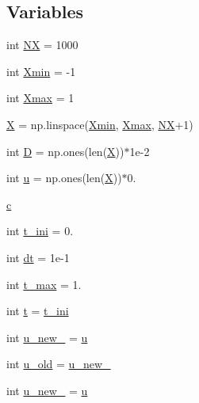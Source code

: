 \subsection*{Variables}
\begin{DoxyCompactItemize}
\item 
int \hyperlink{namespaceSplit__solvers_a6f5cab1ea541e5ae5d4ae5a0d62ab100}{NX} = 1000
\item 
int \hyperlink{namespaceSplit__solvers_abe1cb9889c38d9038ab77c312a857ae5}{Xmin} = -\/1
\item 
int \hyperlink{namespaceSplit__solvers_a3a9b8c9973a6efe018e8b1dd5c13a896}{Xmax} = 1
\item 
\hyperlink{namespaceSplit__solvers_a1884fc9efd3f156e55b75a45f19d7244}{X} = np.\+linspace(\hyperlink{namespaceSplit__solvers_abe1cb9889c38d9038ab77c312a857ae5}{Xmin}, \hyperlink{namespaceSplit__solvers_a3a9b8c9973a6efe018e8b1dd5c13a896}{Xmax}, \hyperlink{namespaceSplit__solvers_a6f5cab1ea541e5ae5d4ae5a0d62ab100}{NX}+1)
\item 
int \hyperlink{namespaceSplit__solvers_a0bcad395b64a658c374ba8a3fb893836}{D} = np.\+ones(len(\hyperlink{namespaceSplit__solvers_a1884fc9efd3f156e55b75a45f19d7244}{X}))$\ast$1e-\/2
\item 
int \hyperlink{namespaceSplit__solvers_abe87b0440e65cc15867b535fe5594457}{u} = np.\+ones(len(\hyperlink{namespaceSplit__solvers_a1884fc9efd3f156e55b75a45f19d7244}{X}))$\ast$0.
\item 
\hyperlink{namespaceSplit__solvers_a8d99b01f11e92c25fdef25ee372ef15e}{c}
\item 
int \hyperlink{namespaceSplit__solvers_a4e16fb7ea5fb14290b3a63e87499dced}{t\+\_\+ini} = 0.
\item 
int \hyperlink{namespaceSplit__solvers_a9d7802821157fdbfdde000b24e2ed31b}{dt} = 1e-\/1
\item 
int \hyperlink{namespaceSplit__solvers_a49303767dbd0cb68ef911cd068fde69a}{t\+\_\+max} = 1.
\item 
int \hyperlink{namespaceSplit__solvers_a6efd428aff22677b6e56b44b8ae5552d}{t} = \hyperlink{namespaceSplit__solvers_a4e16fb7ea5fb14290b3a63e87499dced}{t\+\_\+ini}
\item 
int \hyperlink{namespaceSplit__solvers_ad561a5b47428860b09231ef32d981065}{u\+\_\+new\+\_} = \hyperlink{namespaceSplit__solvers_abe87b0440e65cc15867b535fe5594457}{u}
\item 
int \hyperlink{namespaceSplit__solvers_ab5a06ffd8881f993be924d175cf33bf0}{u\+\_\+old} = \hyperlink{namespaceSplit__solvers_ad561a5b47428860b09231ef32d981065}{u\+\_\+new\+\_}
\item 
int \hyperlink{namespaceSplit__solvers_a660926dfee34f958baddd1154dfa7df0}{u\+\_\+new\+\_} = \hyperlink{namespaceSplit__solvers_abe87b0440e65cc15867b535fe5594457}{u}
\end{DoxyCompactItemize}


